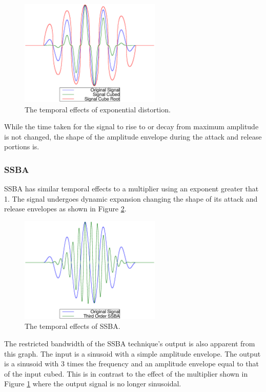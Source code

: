 			\begin{figure}[h!]
				\centering
				\includegraphics[width=0.6\textwidth]{chapter5/Images/ExponentiationTemporalEffects.eps}
				\caption{The temporal effects of exponential distortion.}
				\label{fig:ExponentiationTemporalEffects}
			\end{figure}

			While the time taken for the signal to rise to or decay from maximum amplitude is not changed, the
			shape of the amplitude envelope during the attack and release portions is. 

		\subsubsection*{SSBA}
			SSBA has similar temporal effects to a multiplier using an exponent greater that 1. The signal
			undergoes dynamic expansion changing the shape of its attack and release envelopes as shown in
			Figure \ref{fig:SSBATemporalEffects}.

			\begin{figure}[h!]
				\centering
				\includegraphics[width=0.6\textwidth]{chapter5/Images/SSBATemporalEffects.eps}
				\caption{The temporal effects of SSBA.}
				\label{fig:SSBATemporalEffects}
			\end{figure}

			The restricted bandwidth of the SSBA technique's output is also apparent from this graph. The input
			is a sinusoid with a simple amplitude envelope. The output is a sinusoid with 3 times the frequency
			and an amplitude envelope equal to that of the input cubed. This is in contrast to the effect of
			the multiplier shown in Figure \ref{fig:ExponentiationTemporalEffects} where the output signal is
			no longer sinusoidal.

